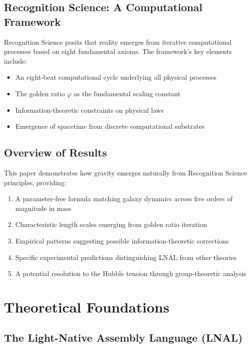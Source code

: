 \documentclass[12pt,a4paper]{article}
\begin{document}
\subsection{Recognition Science: A Computational Framework}

Recognition Science posits that reality emerges from iterative computational processes based on eight fundamental axioms. The framework's key elements include:

\begin{itemize}
\item An eight-beat computational cycle underlying all physical processes
\item The golden ratio $\varphi$ as the fundamental scaling constant
\item Information-theoretic constraints on physical laws
\item Emergence of spacetime from discrete computational substrates
\end{itemize}

\subsection{Overview of Results}

This paper demonstrates how gravity emerges naturally from Recognition Science principles, providing:

\begin{enumerate}
\item A parameter-free formula matching galaxy dynamics across five orders of magnitude in mass
\item Characteristic length scales emerging from golden ratio iteration
\item Empirical patterns suggesting possible information-theoretic corrections
\item Specific experimental predictions distinguishing LNAL from other theories
\item A potential resolution to the Hubble tension through group-theoretic analysis
\end{enumerate}

\section{Theoretical Foundations}

\subsection{The Light-Native Assembly Language (LNAL)}
\end{document}
